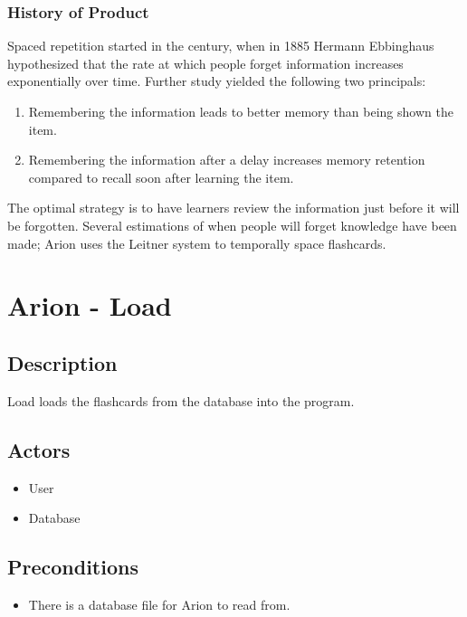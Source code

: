 \documentclass{scrreprt}
\begin{document}
\subsection{History of Product}
Spaced repetition started in the  century, when in 1885 Hermann Ebbinghaus
hypothesized that the rate at which people forget information increases exponentially
over time. Further study yielded the following two principals:
\begin{enumerate}[1.]
    \item Remembering the information leads to better memory than being shown the item.
    \item Remembering the information after a delay increases memory retention compared
        to recall soon after learning the item.
\end{enumerate}
The optimal strategy is to have learners review the information just before it will
be forgotten. Several estimations of when people will forget knowledge have been made;
Arion uses the Leitner system to temporally space flashcards.

\setcounter{chapter}{0} %

\chapter{Arion - Load}

\section{Description}
Load loads the flashcards from the database into the program.

\section{Actors}
\begin{itemize}
    \item User
    \item Database
\end{itemize}

\section{Preconditions}
\begin{itemize}
    \item There is a database file for Arion to read from.
\end{itemize}
\end{document}
